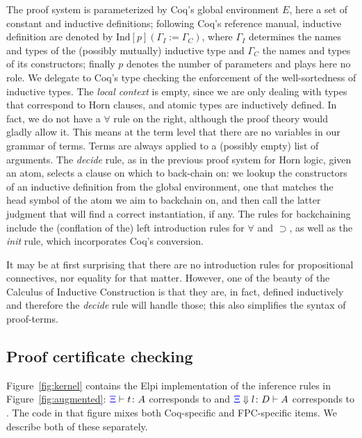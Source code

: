The proof system is parameterized by Coq's global environment $E$,
here a set of constant and inductive definitions; following Coq's
reference manual, inductive definition are denoted by
$\mathrm{Ind}[p] (\Gamma_I := \Gamma_C)$, where $\Gamma_I$ determines
the names and types of the (possibly mutually) inductive type and
$\Gamma_C$ the names and types of its constructors; finally $p$
denotes the number of parameters and plays here no role. We delegate to
Coq's type checking the enforcement of the well-sortedness of
inductive types. The \emph{local context} is empty, since we are only
dealing with types that correspond to Horn clauses, and atomic types
are inductively defined. In fact, we do not have a $\forall$ rule on
the right, although the proof theory would gladly allow it. This means
at the term level that there are no variables in our grammar of
terms. Terms are always applied to a (possibly empty) list of
arguments.  The \emph{decide} rule, %
as in the previous proof system for Horn logic,  given an atom,
 selects a clause on which to back-chain on: we lookup the
constructors of an inductive definition from the global
environment, one that matches the head symbol of the atom we aim to backchain on, and then
call the latter judgment that will find a correct instantiation, if any. The rules for backchaining include
 the (conflation of the) left introduction rules for
$\forall$ and $\supset$, as well as the \emph{init} rule, which incorporates Coq's conversion.

It may be at first surprising that there are no
introduction rules for propositional connectives, nor equality for
that matter. However, one of the beauty of the Calculus of Inductive
Construction is that they are, in fact,  defined inductively and
therefore the \emph{decide} rule will handle those; this also
simplifies the syntax of proof-terms.

\subsection{Proof certificate checking}
\label{ssec:cert}
Figure~\ref{fig:kernel} contains the Elpi implementation of the
inference rules in Figure~\ref{fig:augmented}: ${\color{blue}{\Xi}}\vdash t \colon A$ corresponds to
 and ${\color{blue}{\Xi}} \Downarrow  l \colon D\vdash A$ corresponds to
.
%
The code in that figure mixes both Coq-specific and
FPC-specific items.  We describe both of these separately.

